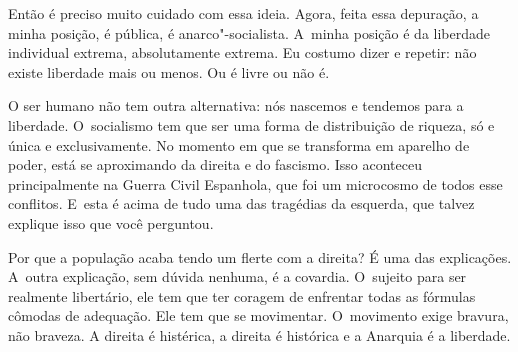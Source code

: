  

Então é preciso muito cuidado com essa ideia. Agora, feita essa
depuração, a minha posição, é pública, é anarco"-socialista. A~minha
posição é da liberdade individual extrema, absolutamente extrema. Eu
costumo dizer e repetir: não existe liberdade mais ou menos. Ou é
livre ou não é.

 

O ser humano não tem outra alternativa: nós nascemos e tendemos para a
liberdade. O~socialismo tem que ser uma forma de distribuição de
riqueza, só e única e exclusivamente. No momento em que se transforma em
aparelho de poder, está se aproximando da direita e do fascismo. Isso
aconteceu principalmente na Guerra Civil Espanhola, que foi um
microcosmo de todos esse conflitos. E~esta é acima de tudo uma das
tragédias da esquerda, que talvez explique isso que você perguntou.

Por que a população acaba tendo um flerte com a direita? É uma das
explicações. A~outra explicação, sem dúvida nenhuma, é a covardia. O~sujeito para ser realmente libertário, ele tem que ter coragem de
enfrentar todas as fórmulas cômodas de adequação. Ele tem que se
movimentar. O~movimento exige bravura, não braveza. A direita é histérica, a direita é 
histórica e a Anarquia é a liberdade. 


 

\fechafala 
